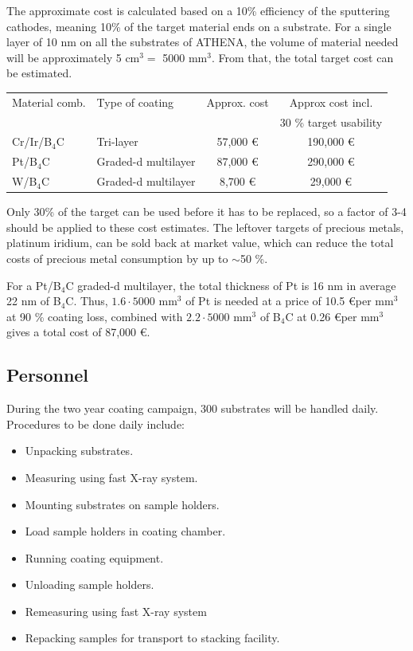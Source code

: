 The approximate cost is calculated based on a 10\% efficiency of the sputtering cathodes, meaning 10\% of the target material ends on a substrate. For a single layer of 10 nm on all the substrates of ATHENA, the volume of material needed will be approximately 5 cm$^3 = $ 5000 mm$^3$. From that, the total target cost can be estimated.

\begin{table}[htbp]
	\centering
\begin{tabular}{l|l|c|c}
Material comb. 	& Type of coating & Approx. cost & Approx cost incl. \\
	&	&	&	30 \% target usability\\
\hline
\hline
Cr/Ir/B$_4$C & Tri-layer & 57,000 \euro & 190,000 \euro \\
\hline
Pt/B$_4$C & Graded-d multilayer & 87,000 \euro & 290,000 \euro\\
\hline
W/B$_4$C & Graded-d multilayer & 8,700 \euro & 29,000 \euro \\
\end{tabular}
\end{table}

Only 30\% of the target can be used before it has to be replaced, so a factor of 3-4 should be applied to these cost estimates. The leftover targets of precious metals, platinum iridium, can be sold back at market value, which can reduce the total costs of precious metal consumption by up to $\sim$50 \%.

For a Pt/B$_4$C graded-d multilayer, the total thickness of Pt is 16 nm in average 22 nm of B$_4$C. Thus, $1.6 \cdot 5000$ mm$^3$ of Pt is needed at a price of 10.5 \euro per mm$^3$ at 90 \% coating loss, combined with $2.2 \cdot 5000$ mm$^3$ of B$_4$C at 0.26 \euro per mm$^3$ gives a total cost of 87,000 \euro.

\subsection{Personnel}
During the two year coating campaign, 300 substrates will be handled daily. Procedures to be done daily include:

\begin{itemize}[itemsep=1.5pt,parsep=1pt]
	\item Unpacking substrates.
	\item Measuring using fast X-ray system.
	\item Mounting substrates on sample holders.
	\item Load sample holders in coating chamber.
	\item Running coating equipment.
	\item Unloading sample holders.
	\item Remeasuring using fast X-ray system
	\item Repacking samples for transport to stacking facility.
\end{itemize}

